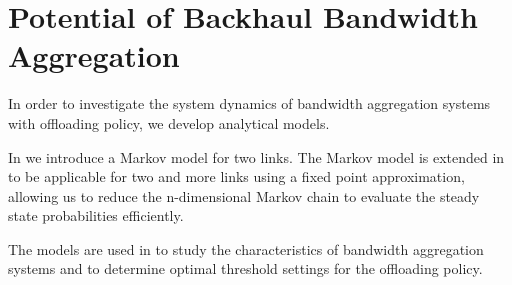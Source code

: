 \section{Potential of Backhaul Bandwidth Aggregation}\label{sec:aggregation:model}

In order to investigate the system dynamics of bandwidth aggregation systems with offloading policy, we develop analytical models.

In  we introduce a Markov model for two links. The Markov model is extended in  to be applicable for two and more links using a fixed point approximation, allowing us to reduce the n-dimensional Markov chain to evaluate the steady state probabilities efficiently.

The models are used in  to study the characteristics of bandwidth aggregation systems and to determine optimal threshold settings for the offloading policy.



